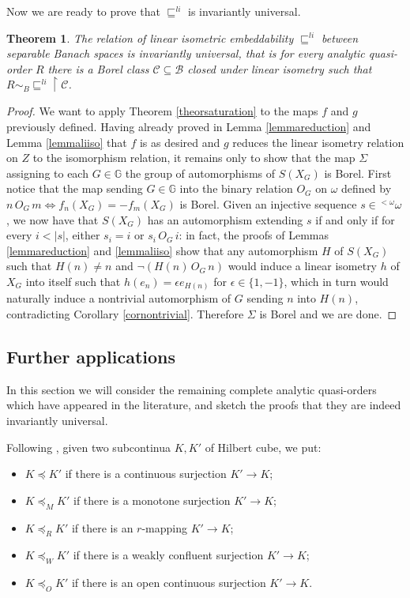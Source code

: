 \documentclass{amsart}
\newtheorem{theorem}{Theorem}[section]
\theoremstyle{definition}
\theoremstyle{remark}
\begin{document}
Now we are ready to prove that $\sqsubseteq^{li}$ is invariantly universal.

\begin{theorem}
 The relation of linear isometric embeddability $\sqsubseteq^{li}$
 between separable Banach spaces is invariantly universal, that is for
 every analytic quasi-order $R$ there is a Borel class $\mathcal{C}
 \subseteq \mathcal{B}$ closed under linear isometry such that $R
 \sim_B \sqsubseteq^{li} \restriction \mathcal{C}$.
\end{theorem}

\begin{proof}
 We want to apply Theorem \ref{theorsaturation} to the maps $f$ and
 $g$ previously defined. Having already proved in Lemma
 \ref{lemmareduction} and Lemma
 \ref{lemmaliiso} that $f$ is as desired
 and $g$ reduces the linear isometry relation on $Z$ to the
 isomorphism relation, it remains only to show that the map $\Sigma$
 assigning to each $G \in {\mathbb{G}}$ the group of automorphisms of $S(X_G)$ is
 Borel. First notice that the map sending $G \in {\mathbb{G}}$ into the binary
 relation $O_G$ on $\omega$ defined by $n\, O_G\, m \iff f_n(X_G) = -
 f_m(X_G)$ is Borel. Given an injective sequence $s \in {}^{< \omega}
 \omega$, we now have that $S(X_G)$ has an automorphism extending $s$
 if and only if for every $i < | s|$, either $s_i = i$ or $s_i\, O_G
 \, i$: in fact, the proofs of Lemmas \ref{lemmareduction} and \ref{lemmaliiso}
 show that any automorphism $H$ of $S(X_G)$ such that $H(n) \neq n$
 and $\neg (H(n) \, O_G \, n)$ would
 induce a linear isometry $h$ of $X_G$ into itself such that $h(e_n) =
 \epsilon e_{H(n)}$ for $ \epsilon \in \{ 1,-1\}$, which in turn
 would naturally induce a nontrivial automorphism of $G$ sending $n$
 into $H(n)$, contradicting
 Corollary \ref{cornontrivial}. Therefore $\Sigma$ is Borel and we are
 done.
\end{proof}

\subsection{Further applications}\label{further}

In this section we will consider the remaining complete analytic quasi-orders which have appeared in the literature, and sketch the proofs that they are indeed invariantly universal.

Following \cite{Camerlo2005}, given two subcontinua $K,K'$ of Hilbert cube, we put:
\begin{itemize}
\item $K \preceq K'$ if there is a continuous surjection $K' \to K$;
\item $K \preceq_M K'$ if there is a monotone surjection $K' \to K$;
\item $K \preceq_R K'$ if there is an $r$-mapping $K' \to K$;
\item $K \preceq_W K'$ if there is a weakly confluent surjection $K' \to K$;
\item $K \preceq_O K'$ if there is an open continuous surjection $K' \to K$.
\end{itemize}
\end{document}
